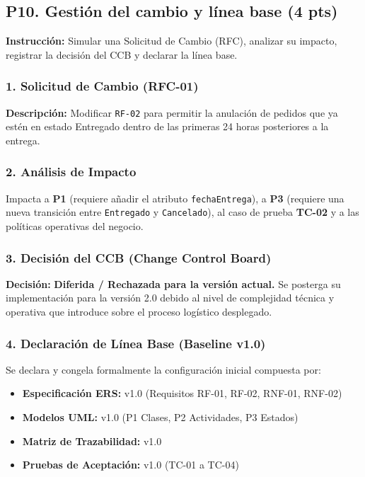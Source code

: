 \documentclass[12pt,a4paper]{article}
\begin{document}
\newpage

\subsection*{P10. Gestión del cambio y línea base (4 pts)}
\textbf{Instrucción:} Simular una Solicitud de Cambio (RFC), analizar su impacto, registrar la decisión del CCB y declarar la línea base.

\subsubsection*{1. Solicitud de Cambio (RFC-01)}
\textbf{Descripción:} Modificar \texttt{RF-02} para permitir la anulación de pedidos que ya estén en estado Entregado dentro de las primeras 24 horas posteriores a la entrega.

\subsubsection*{2. Análisis de Impacto}
Impacta a \textbf{P1} (requiere añadir el atributo \texttt{fechaEntrega}), a \textbf{P3} (requiere una nueva transición entre \texttt{Entregado} y \texttt{Cancelado}), al caso de prueba \textbf{TC-02} y a las políticas operativas del negocio.

\subsubsection*{3. Decisión del CCB (Change Control Board)}
\textbf{Decisión:} \textbf{Diferida / Rechazada para la versión actual.} Se posterga su implementación para la versión 2.0 debido al nivel de complejidad técnica y operativa que introduce sobre el proceso logístico desplegado.

\subsubsection*{4. Declaración de Línea Base (Baseline v1.0)}
Se declara y congela formalmente la configuración inicial compuesta por:
\begin{itemize}
    \item \textbf{Especificación ERS:} v1.0 (Requisitos RF-01, RF-02, RNF-01, RNF-02)
    \item \textbf{Modelos UML:} v1.0 (P1 Clases, P2 Actividades, P3 Estados)
    \item \textbf{Matriz de Trazabilidad:} v1.0
    \item \textbf{Pruebas de Aceptación:} v1.0 (TC-01 a TC-04)
\end{itemize}
\end{document}
